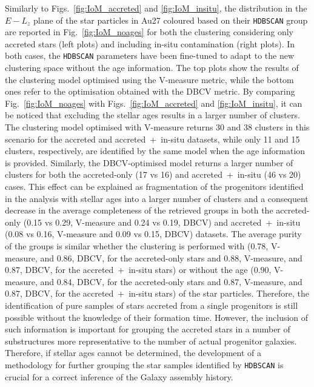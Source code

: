 Similarly to Figs.~\ref{fig:IoM_accreted} and \ref{fig:IoM_insitu}, the distribution in the $E-L_z$ plane of the star particles in Au27 coloured based on their \texttt{HDBSCAN} group are reported in Fig.~\ref{fig:IoM_noages} for both the clustering considering only accreted stars (left plots) and including in-situ contamination (right plots). In both cases, the \texttt{HDBSCAN} parameters have been fine-tuned to adapt to the new clustering space without the age information. The top plots show the results of the clustering model optimised using the V-measure metric, while the bottom ones refer to the optimisation obtained with the DBCV metric. By comparing Fig.~\ref{fig:IoM_noages} with Figs.~\ref{fig:IoM_accreted} and \ref{fig:IoM_insitu}, it can be noticed that excluding the stellar ages results in a larger number of clusters. The clustering model optimised with V-measure returns 30 and 38 clusters in this scenario for the accreted and accreted~+~in-situ datasets, while only 11 and 15 clusters, respectively, are identified by the same model when the age information is provided. Similarly, the DBCV-optimised model returns a larger number of clusters for both the accreted-only (17 vs 16) and accreted~+~in-situ (46 vs 20) cases. This effect can be explained as fragmentation of the progenitors identified in the analysis with stellar ages into a larger number of clusters and a consequent decrease in the average completeness of the retrieved groups in both the accreted-only  (0.15 vs 0.29, V-measure and 0.24 vs 0.19, DBCV) and accreted~+~in-situ (0.08 vs 0.16, V-measure and 0.09 vs 0.15, DBCV) datasets. The average purity of the groups is similar whether the clustering is performed with (0.78, V-measure, and 0.86, DBCV, for the accreted-only stars and 0.88, V-measure, and 0.87, DBCV, for the accreted~+~in-situ stars) or without the age (0.90, V-measure, and 0.84, DBCV, for the accreted-only stars and 0.87, V-measure, and 0.87, DBCV, for the accreted~+~in-situ stars) of the star particles. Therefore, the identification of pure samples of stars accreted from a single progenitors is still possible without the knowledge of their formation time. However, the inclusion of such information is important for grouping the accreted stars in a number of substructures more representative to the number of actual progenitor galaxies. Therefore, if stellar ages cannot be determined, the development of a methodology for further grouping the star samples identified by \texttt{HDBSCAN} is crucial for a correct inference of the Galaxy assembly history.


